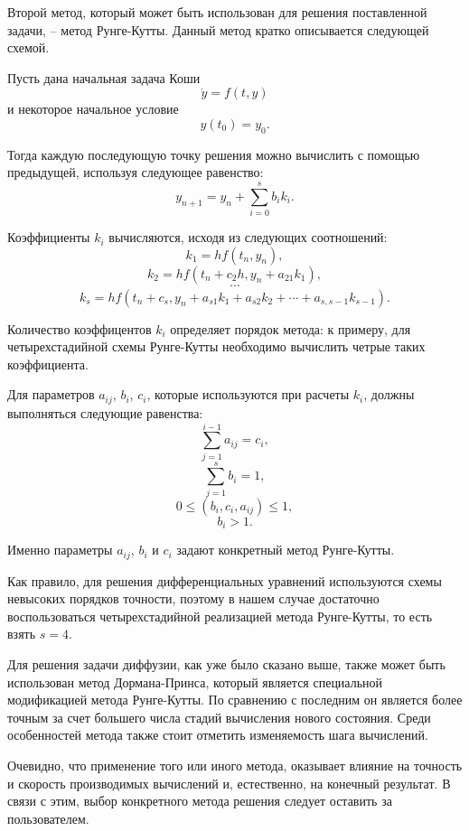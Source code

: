\documentclass[a4paper, 14pt]{extarticle}
\theoremstyle{definition}
\begin{document}
\par Второй метод, который может быть использован для решения поставленной задачи, -- метод Рунге-Кутты. Данный метод кратко описывается следующей схемой.

\par Пусть дана начальная задача Коши
$$\dot y = f(t, y)$$
и некоторое начальное условие
$$y(t_0) = y_0.$$

\par Тогда каждую последующую точку решения можно вычислить с помощью предыдущей, используя следующее равенство:
$$y_{n+1} = y_n + \sum_{i=0}^s b_i k_i.$$

\par Коэффициенты $k_i$ вычисляются, исходя из следующих соотношений:
$$k_1 = hf(t_n, y_n),$$
$$k_2 = hf(t_n + c_2 h, y_n + a_{21}k_1),$$
$$\cdots$$
$$k_s = hf(t_n + c_s, y_n + a_{s1}k_1 + a_{s2}k_2 + \cdots + a_{s,s-1}k_{s-1}).$$

\par Количество коэффицентов $k_i$ определяет порядок метода: к примеру, для четырехстадийной схемы Рунге-Кутты необходимо вычислить четрые таких коэффициента.

\par Для параметров $a_{ij}$, $b_i$, $c_i$, которые используются при расчеты $k_i$, должны выполняться следующие равенства:
$$\sum_{j=1}^{i-1}{a_{ij}} = c_i,$$
$$\sum_{j=1}^s{b_i} = 1,$$
$$0 \le (b_i, c_i, a_{ij}) \le 1,$$
$$b_i > 1.$$

\par Именно параметры $a_{ij}$, $b_i$ и $c_i$ задают конкретный метод Рунге-Кутты.

\par Как правило, для решения дифференциальных уравнений используются схемы невысоких порядков точности, поэтому в нашем случае достаточно воспользоваться четырехстадийной реализацией метода Рунге-Кутты, то есть взять $s = 4$.

\par Для решения задачи диффузии, как уже было сказано выше, также может быть использован метод Дормана-Принса, который является специальной модификацией метода Рунге-Кутты. По сравнению с последним он является более точным за счет большего числа стадий вычисления нового состояния. Среди особенностей метода также стоит отметить изменяемость шага вычислений.

\par Очевидно, что применение того или иного метода, оказывает влияние на точность и скорость производимых вычислений и, естественно, на конечный результат. В связи с этим, выбор конкретного метода решения следует оставить за пользователем.
\end{document}
